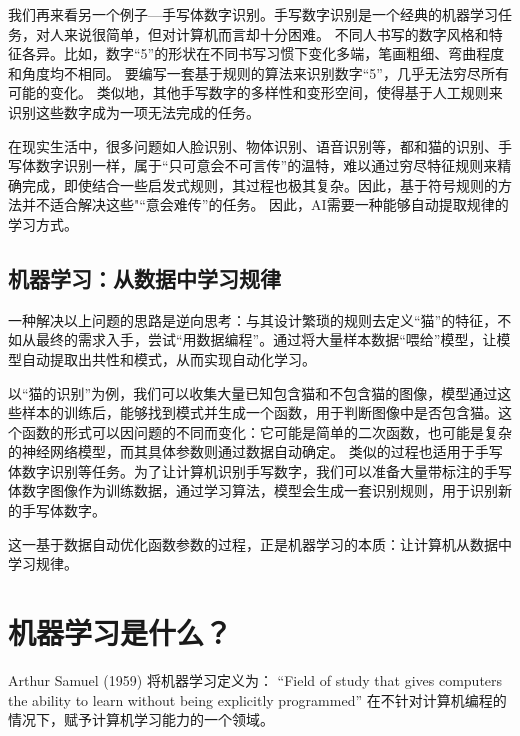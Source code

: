 我们再来看另一个例子---手写体数字识别。手写数字识别\cite{LeCun et al., 1998}是一个经典的机器学习任务，对人来说很简单，但对计算机而言却十分困难。
不同人书写的数字风格和特征各异。比如，数字“5”的形状在不同书写习惯下变化多端，笔画粗细、弯曲程度和角度均不相同。
要编写一套基于规则的算法来识别数字“5”，几乎无法穷尽所有可能的变化。
类似地，其他手写数字的多样性和变形空间，使得基于人工规则来识别这些数字成为一项无法完成的任务。

在现实生活中，很多问题如人脸识别、物体识别、语音识别等，都和猫的识别、手写体数字识别一样，属于“只可意会不可言传”的温特，难以通过穷尽特征规则来精确完成，即使结合一些启发式规则，其过程也极其复杂。因此，基于符号规则的方法并不适合解决这些"“意会难传”的任务。
因此，AI需要一种能够自动提取规律的学习方式。

\subsection{机器学习：从数据中学习规律}
一种解决以上问题的思路是逆向思考：与其设计繁琐的规则去定义“猫”的特征，不如从最终的需求入手，尝试“用数据编程”。通过将大量样本数据“喂给”模型，让模型自动提取出共性和模式，从而实现自动化学习。

以“猫的识别”为例，我们可以收集大量已知包含猫和不包含猫的图像，模型通过这些样本的训练后，能够找到模式并生成一个函数，用于判断图像中是否包含猫。这个函数的形式可以因问题的不同而变化：它可能是简单的二次函数，也可能是复杂的神经网络模型，而其具体参数则通过数据自动确定。
类似的过程也适用于手写体数字识别等任务。为了让计算机识别手写数字，我们可以准备大量带标注的手写体数字图像作为训练数据，通过学习算法，模型会生成一套识别规则，用于识别新的手写体数字。

这一基于数据自动优化函数参数的过程，正是机器学习的本质：让计算机从数据中学习规律。

\section{机器学习是什么？}\label{sec:机器学习}

Arthur Samuel (1959) 将机器学习定义为：
“Field of study that gives computers the ability to learn without being explicitly programmed”
在不针对计算机编程的情况下，赋予计算机学习能力的一个领域。

